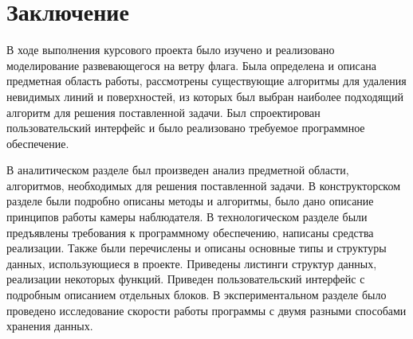 \chapter*{Заключение}
\vspace{-0.5cm}\hspace{0.6cm}В ходе выполнения курсового проекта было изучено и реализовано моделирование развевающегося на ветру флага. Была определена и описана предметная область работы, рассмотрены существующие алгоритмы для удаления невидимых линий и поверхностей, из которых был выбран наиболее подходящий алгоритм для решения поставленной задачи. Был спроектирован пользовательский интерфейс и было реализовано требуемое программное обеспечение.

\vspace{0.3cm}В аналитическом разделе был произведен анализ предметной области, алгоритмов, необходимых для решения поставленной задачи. В конструкторском разделе были подробно описаны методы и алгоритмы, было дано описание принципов работы камеры наблюдателя. В технологическом разделе были предъявлены требования к программному обеспечению, написаны средства реализации. Также были перечислены и описаны основные типы и структуры данных, использующиеся в проекте. Приведены листинги структур данных, реализации некоторых функций. Приведен пользовательский интерфейс с подробным описанием отдельных блоков. В экспериментальном разделе было проведено исследование скорости работы программы с двумя разными способами хранения данных.

\newpage

